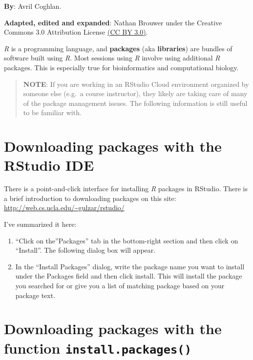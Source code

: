 \documentclass[
]{book}
\providecommand{\tightlist}{%
  \setlength{\itemsep}{0pt}\setlength{\parskip}{0pt}}
\begin{document}
\textbf{By}: Avril Coghlan.

\textbf{Adapted, edited and expanded}: Nathan Brouwer under the Creative Commons 3.0 Attribution License \href{https://creativecommons.org/licenses/by/3.0/}{(CC BY 3.0)}.

\emph{R} is a programming language, and \textbf{packages} (aka \textbf{libraries}) are bundles of software built using \emph{R}. Most sessions using \emph{R} involve using additional \emph{R} packages. This is especially true for bioinformatics and computational biology.

\begin{quote}
\textbf{NOTE}: If you are working in an RStudio Cloud environment organized by someone else (e.g.~a course instructor), they likely are taking care of many of the package management issues. The following information is still useful to be familiar with.
\end{quote}

\hypertarget{downloading-packages-with-the-rstudio-ide}{%
\section{Downloading packages with the RStudio IDE}\label{downloading-packages-with-the-rstudio-ide}}

There is a point-and-click interface for installing \emph{R} packages in RStudio. There is a brief introduction to downloading packages on this site: \url{http://web.cs.ucla.edu/~gulzar/rstudio/}

I've summarized it here:

\begin{enumerate}
\def\labelenumi{\arabic{enumi}.}
\tightlist
\item
  ``Click on the''Packages'' tab in the bottom-right section and then click on ``Install''. The following dialog box will appear.
\item
  In the ``Install Packages'' dialog, write the package name you want to install under the Packages field and then click install. This will install the package you searched for or give you a list of matching package based on your package text.
\end{enumerate}

\hypertarget{downloading-packages-with-the-function-install.packages}{%
\section{\texorpdfstring{Downloading packages with the function \texttt{install.packages()}}{Downloading packages with the function install.packages()}}\label{downloading-packages-with-the-function-install.packages}}
\end{document}
